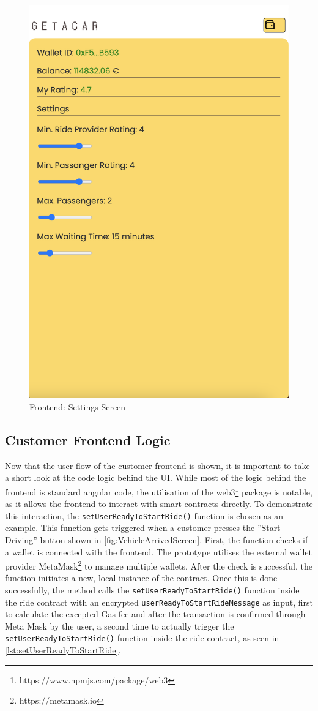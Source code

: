 \begin{figure}[H]
    \centering
    \includegraphics[width=0.45\linewidth]{data/ffss/13.png}
    \caption{Frontend: Settings Screen}
    \label{fig:SettingsScreen}
\end{figure}


\subsection{Customer Frontend Logic}
Now that the user flow of the customer frontend is shown, it is important to take a short look at the code logic behind the UI. While most of the logic behind the frontend is standard angular code, the utilisation of the web3\footnote{https://www.npmjs.com/package/web3} package is notable, as it allows the frontend to interact with smart contracts directly. To demonstrate this interaction, the \texttt{setUserReadyToStartRide()} function is chosen as an example. This function gets triggered when a customer presses the ''Start Driving'' button shown in \ref{fig:VehicleArrivedScreen}. First, the function checks if a wallet is connected with the frontend. The prototype utilises the external wallet provider MetaMask\footnote{https://metamask.io} to manage multiple wallets. After the check is successful, the function initiates a new, local instance of the contract. Once this is done successfully, the method calls the \texttt{setUserReadyToStartRide()} function inside the ride contract with an encrypted \texttt{userReadyToStartRideMessage} as input, first to calculate the excepted Gas fee and after the transaction is confirmed through Meta Mask by the user, a second time to actually trigger the \texttt{setUserReadyToStartRide()} function inside the ride contract, as seen in \ref{lst:setUserReadyToStartRide}.

